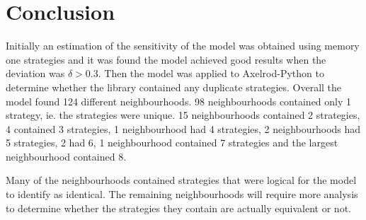\section{Conclusion}

Initially an estimation of the sensitivity of the model was obtained using memory one strategies and it was found the model achieved good results when the deviation was $\delta > 0.3$.
Then the model was applied to Axelrod-Python to determine whether the library contained any duplicate strategies.
Overall the model found 124 different neighbourhoods.
98 neighbourhoods contained only 1 strategy, ie. the strategies were unique.
15 neighbourhoods contained 2 strategies, 4 contained 3 strategies, 1 neighbourhood had 4 strategies, 2 neighbourhoods had 5 strategies, 2 had 6, 1 neighbourhood contained 7 strategies and the largest neighbourhood contained 8.

Many of the neighbourhoods contained strategies that were logical for the model to identify as identical.
The remaining neighbourhoods will require more analysis to determine whether the strategies they contain are actually equivalent or not.
